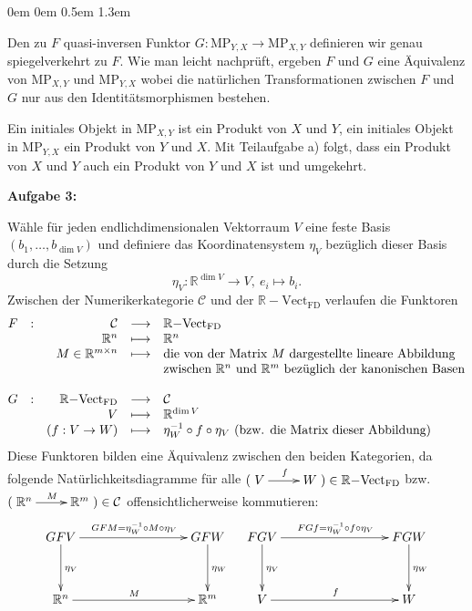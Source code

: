 \documentclass[a4paper,ngerman]{scrartcl}
\theoremstyle{definition}
\theoremstyle{plain}
\theoremstyle{remark}
\newcommand{\R}{\mathbb{R}}
\newcommand{\C}{\mathcal{C}}
\newcommand{\Vect}{\mathrm{Vect}}
\newcommand{\MP}{\mathrm{MP}}
\begin{document}
\begin{list}{}{0em \leftmargin0em \itemindent0.5em \itemsep 1.3em}
\begin{enumerate}
Den zu $F$ quasi-inversen Funktor $G:\MP_{Y,X} \to \MP_{X,Y}$ definieren wir genau spiegelverkehrt zu $F$. Wie man leicht nachprüft, ergeben $F$ und $G$ eine Äquivalenz von $\MP_{X,Y}$ und $\MP_{Y,X}$ wobei die natürlichen Transformationen zwischen $F$ und $G$ nur aus den Identitätsmorphismen bestehen.

Ein initiales Objekt in $\MP_{X,Y}$ ist ein Produkt von $X$ und $Y$, ein initiales Objekt in $\MP_{Y,X}$ ein Produkt von $Y$ und $X$. Mit Teilaufgabe a) folgt, dass ein Produkt von $X$ und $Y$ auch ein Produkt von $Y$ und $X$ ist und umgekehrt.

\end{enumerate}

\item[\textbf{Aufgabe 3:}]\mbox{}

Wähle für jeden endlichdimensionalen Vektorraum $V$ eine feste Basis $(b_1, \ldots, b_{\dim V})$ und definiere das Koordinatensystem $\eta_V$ bezüglich dieser Basis durch die Setzung
\[ \eta_V:\R^{\dim V} \to V,\ e_i \mapsto b_i. \]
Zwischen der Numerikerkategorie $\C$ und der $\R{-}\Vect_{\mathrm{FD}}$ verlaufen die Funktoren
\[ \begin{array}{@{}rcrcl@{}}
  F &:& \C & \longrightarrow & \R{-}\Vect_{\mathrm{FD}}\\
  && \R^{n} & \longmapsto & \R^{n}\\
  && M \in \R^{m \times n} & \longmapsto & \text{die von der Matrix $M$ dargestellte lineare Abbildung}\\
  &&&& \text{zwischen $\R^n$ und $\R^m$ bezüglich der kanonischen Basen}\\\\
  G &:& \R{-}\Vect_{\mathrm{FD}} & \longrightarrow & \C\\
  && V & \longmapsto & \R^{\dim V}\\
  && (f:V \to W) & \longmapsto & \eta_W^{-1} \circ f \circ \eta_V \text{ (bzw. die Matrix dieser Abbildung)}
\end{array} \]
Diese Funktoren bilden eine Äquivalenz zwischen den beiden Kategorien, da folgende Natürlichkeitsdiagramme für alle $(\xymatrix{V \ar[r]^f & W}) \in \R{-}\Vect_{\mathrm{FD}}$ bzw. $(\xymatrix{\R^n \ar[r]^M & \R^m}) \in \C$ offensichtlicherweise kommutieren:
\[ \xymatrixcolsep{7pc}\xymatrixrowsep{3pc}
\xymatrix{
  GFV \ar[d]^{\eta_V} \ar[r]^{GFM = \eta_W^{-1} \circ M \circ \eta_V} & GFW \ar[d]^{\eta_W}\\
  \R^{n} \ar[r]^{M} & \R^{m}
}
\quad
\xymatrix{
  FGV \ar[d]^{\eta_V} \ar[r]^{FGf = \eta_W^{-1} \circ f \circ \eta_V} & FGW \ar[d]^{\eta_W}\\
  V \ar[r]^{f} & W
} \]


\end{list}
\end{document}
